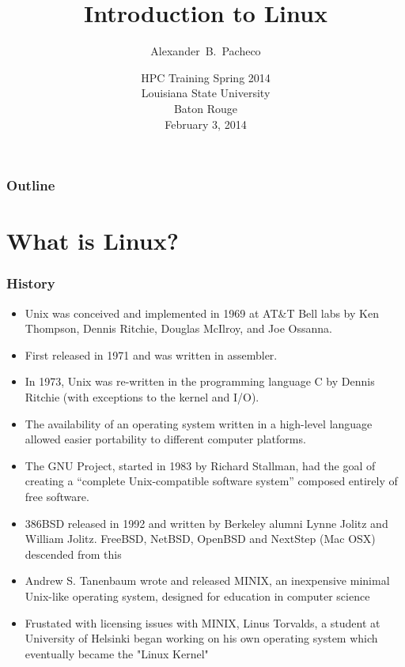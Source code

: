\documentclass[c,compress,xcolor=svgnames]{beamer}
\title{Introduction to Linux}
\author[Alex Pacheco]{\large{Alexander~B.~Pacheco}}
\institute[HPC Training: Spring 2014] {\inst{}\footnotesize{User Services Consultant\\LSU HPC \& LONI\\sys-help@loni.org}}
\date[\insertframenumber/\inserttotalframenumber\hfill\hspace{1.5cm}]{\scriptsize{HPC Training Spring 2014\\Louisiana State University\\Baton Rouge\\February 3, 2014}}
\begin{document}
\frame{\titlepage}

\footnotesize

\begin{frame}[label=toc,squeeze]
  \footnotesize
  \frametitle{\small{Outline}}
  \tableofcontents
\end{frame}

\section{What is Linux?}
\begin{frame}[allowframebreaks]
  \frametitle{\small History}
  \begin{itemize}
    \item Unix was conceived and implemented in 1969 at AT\&T Bell labs by  Ken Thompson, Dennis Ritchie, Douglas McIlroy, and Joe Ossanna.
    \item First released in 1971 and was written in assembler.
    \item In 1973, Unix was re-written in the programming language C by Dennis Ritchie (with exceptions to the kernel and I/O).
    \item The availability of an operating system written in a high-level language allowed easier portability to different computer platforms.
    \item The GNU Project, started in 1983 by Richard Stallman, had the goal of creating a ``complete Unix-compatible software system'' composed entirely of free software.
    \item 386BSD released in 1992 and written by Berkeley alumni Lynne Jolitz and William Jolitz. FreeBSD, NetBSD, OpenBSD and NextStep (Mac OSX) descended from this
    \item Andrew S. Tanenbaum wrote and released MINIX, an inexpensive minimal Unix-like operating system, designed for education in computer science
%
    \item Frustated with licensing issues with MINIX, Linus Torvalds, a student at University of Helsinki began working on his own operating system which eventually became the "Linux Kernel"

\end{itemize}
\end{frame}
\end{document}
